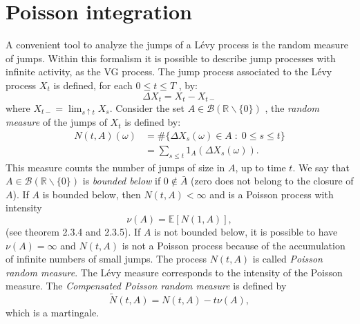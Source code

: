 \documentclass[]{interact}
\newcommand{\numberset}{\mathbb}
\newcommand{\R}{\numberset{R}}
\theoremstyle{plain}%
\theoremstyle{definition}
\theoremstyle{remark}
\begin{document}
\appendix
\section{Poisson integration}\label{App1}

A convenient tool to analyze the jumps of a Lévy process is the random
measure of jumps. Within this formalism it is possible to describe jump processes with infinite activity, as the VG process.
The jump process associated to the Lévy process $X_t$ is
defined, for each $0\leq t\leq T$ , by:
\begin{equation}\label{jump}
 \Delta X_t = X_t - X_{t-}
\end{equation}
where $X_{t-} = \lim_{s\uparrow t} X_s $. 
Consider the set $A \in \mathcal{B}(\R \backslash \{ 0 \})$ ,
the \emph{random measure} of the jumps of $X_t$ is defined by:
\begin{align}
 N(t,A)(\omega) &= \# \{ \Delta X_s(\omega) \in A \; : \; 0\leq s \leq t  \} \\
		   &= \sum_{s\leq t} 1_A(\Delta X_s(\omega)) . \nonumber
\end{align} 
This measure counts the number of jumps of size in $A$, up to time $t$.
We say that $A\in \mathcal{B}(\R \backslash \{ 0 \})$ is \emph{bounded below} if $0 \not \in \bar A$ (zero does not belong to the closure of $A$). 
If $A$ is bounded below, then $N(t,A) < \infty$ and is a Poisson process with intensity 
 \begin{equation}
 \nu(A) = \mathbb{E}[N(1,A) ] ,
 \end{equation}
 (see \cite{Applebaum} 
 theorem 2.3.4 and 2.3.5). 
 If $A$ is not bounded below, it is possible to have $\nu(A) = \infty$ and $N(t,A)$ is not a Poisson process because of the accumulation of infinite numbers of
 small jumps.
 The process $N(t,A)$ is called \emph{Poisson random measure}. The Lévy measure corresponds to the intensity 
 of the Poisson measure.
 The \emph{Compensated Poisson random measure} is defined by
 \begin{equation}
  \tilde{N}(t,A) = N(t,A) - t\nu(A), 
 \end{equation}
which is a martingale.
\end{document}
